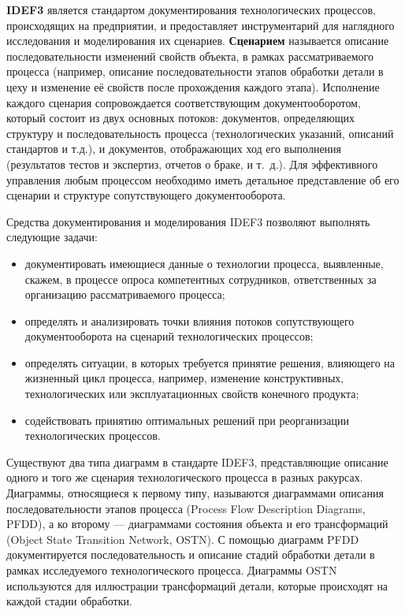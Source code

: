 \textbf{IDEF3} является стандартом документирования технологических
процессов, происходящих на предприятии, и предоставляет инструментарий
для наглядного исследования и моделирования их сценариев.
\textbf{Сценарием} называется описание последовательности изменений свойств
объекта, в рамках рассматриваемого процесса (например, описание
последовательности этапов обработки детали в цеху и изменение её свойств
после прохождения каждого этапа).
Исполнение каждого сценария сопровождается соответствующим документооборотом,
который состоит из двух основных потоков: документов, определяющих структуру и
последовательность процесса (технологических указаний, описаний
стандартов и т.д.), и документов, отображающих ход его выполнения
(результатов тестов и экспертиз, отчетов о браке, и т.~д.).
Для эффективного управления любым процессом необходимо иметь детальное
представление об его сценарии и структуре сопутствующего документооборота.

Средства документирования и моделирования IDEF3 позволяют выполнять следующие
задачи:
\begin{itemize}
\item документировать имеющиеся данные о технологии процесса,
выявленные, скажем, в процессе опроса компетентных сотрудников,
ответственных за организацию рассматриваемого процесса;
\item определять и анализировать точки влияния потоков сопутствующего
документооборота на сценарий технологических процессов;
\item определять ситуации, в которых требуется принятие решения,
влияющего на жизненный цикл процесса, например, изменение
конструктивных, технологических или эксплуатационных свойств конечного
продукта;
\item содействовать принятию оптимальных решений при реорганизации
технологических процессов.
\end{itemize}

Существуют два типа диаграмм в стандарте IDEF3, представляющие
описание одного и того же сценария технологического процесса в разных
ракурсах. Диаграммы, относящиеся к первому типу, называются
диаграммами описания последовательности этапов процесса
(Process Flow Description Diagrams, PFDD), а ко второму ---
диаграммами состояния объекта и его трансформаций
(Object State Transition Network, OSTN).
С помощью диаграмм PFDD документируется последовательность и
описание стадий обработки детали в рамках исследуемого технологического
процесса.
Диаграммы OSTN используются для иллюстрации трансформаций детали,
которые происходят на каждой стадии обработки.

